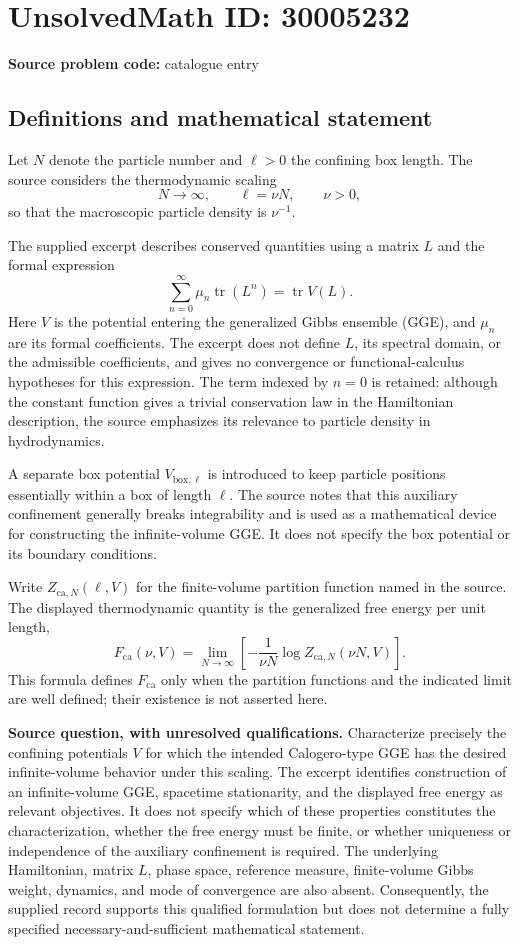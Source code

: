 \documentclass[11pt]{article}
\begin{document}
\section*{UnsolvedMath ID: 30005232}
\textbf{Source problem code:} catalogue entry
\subsection{Definitions and mathematical statement}
Let \(N\) denote the particle number and \(\ell>0\) the confining box length. The source considers the thermodynamic scaling
\[
N\longrightarrow\infty,\qquad \ell=\nu N,\qquad \nu>0,
\]
so that the macroscopic particle density is \(\nu^{-1}\).

The supplied excerpt describes conserved quantities using a matrix \(L\) and the formal expression
\[
\sum_{n=0}^{\infty}\mu_n\operatorname{tr}(L^n)
=\operatorname{tr}V(L).
\]
Here \(V\) is the potential entering the generalized Gibbs ensemble (GGE), and \(\mu_n\) are its formal coefficients. The excerpt does not define \(L\), its spectral domain, or the admissible coefficients, and gives no convergence or functional-calculus hypotheses for this expression. The term indexed by \(n=0\) is retained: although the constant function gives a trivial conservation law in the Hamiltonian description, the source emphasizes its relevance to particle density in hydrodynamics.

A separate box potential \(V_{\mathrm{box},\ell}\) is introduced to keep particle positions essentially within a box of length \(\ell\). The source notes that this auxiliary confinement generally breaks integrability and is used as a mathematical device for constructing the infinite-volume GGE. It does not specify the box potential or its boundary conditions.

Write \(Z_{\mathrm{ca},N}(\ell,V)\) for the finite-volume partition function named in the source. The displayed thermodynamic quantity is the generalized free energy per unit length,
\[
F_{\mathrm{ca}}(\nu,V)
=\lim_{N\to\infty}
\left[-\frac{1}{\nu N}\log Z_{\mathrm{ca},N}(\nu N,V)\right].
\]
This formula defines \(F_{\mathrm{ca}}\) only when the partition functions and the indicated limit are well defined; their existence is not asserted here.

\textbf{Source question, with unresolved qualifications.} Characterize precisely the confining potentials \(V\) for which the intended Calogero-type GGE has the desired infinite-volume behavior under this scaling. The excerpt identifies construction of an infinite-volume GGE, spacetime stationarity, and the displayed free energy as relevant objectives. It does not specify which of these properties constitutes the characterization, whether the free energy must be finite, or whether uniqueness or independence of the auxiliary confinement is required. The underlying Hamiltonian, matrix \(L\), phase space, reference measure, finite-volume Gibbs weight, dynamics, and mode of convergence are also absent. Consequently, the supplied record supports this qualified formulation but does not determine a fully specified necessary-and-sufficient mathematical statement.
\end{document}
